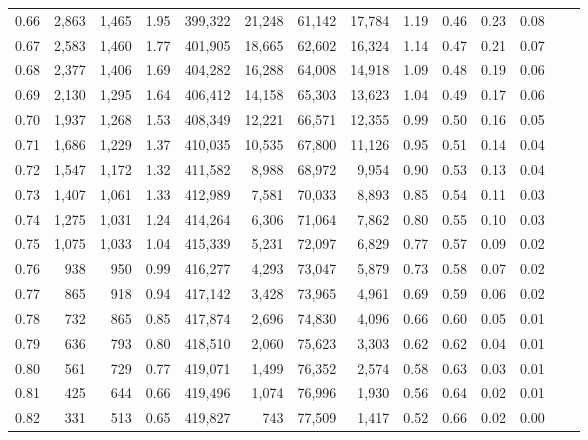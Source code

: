 \begin{tabular}{rrrrrrrrrrrrrr}
0.66 &   2,863 &  1,465 &    1.95 &  399,322 &   21,248 &  61,142 &  17,784 &  1.19 &  0.46 &  0.23 &      0.08 \\
0.67 &   2,583 &  1,460 &    1.77 &  401,905 &   18,665 &  62,602 &  16,324 &  1.14 &  0.47 &  0.21 &      0.07 \\
0.68 &   2,377 &  1,406 &    1.69 &  404,282 &   16,288 &  64,008 &  14,918 &  1.09 &  0.48 &  0.19 &      0.06 \\
0.69 &   2,130 &  1,295 &    1.64 &  406,412 &   14,158 &  65,303 &  13,623 &  1.04 &  0.49 &  0.17 &      0.06 \\
0.70 &   1,937 &  1,268 &    1.53 &  408,349 &   12,221 &  66,571 &  12,355 &  0.99 &  0.50 &  0.16 &      0.05 \\
0.71 &   1,686 &  1,229 &    1.37 &  410,035 &   10,535 &  67,800 &  11,126 &  0.95 &  0.51 &  0.14 &      0.04 \\
0.72 &   1,547 &  1,172 &    1.32 &  411,582 &    8,988 &  68,972 &   9,954 &  0.90 &  0.53 &  0.13 &      0.04 \\
0.73 &   1,407 &  1,061 &    1.33 &  412,989 &    7,581 &  70,033 &   8,893 &  0.85 &  0.54 &  0.11 &      0.03 \\
0.74 &   1,275 &  1,031 &    1.24 &  414,264 &    6,306 &  71,064 &   7,862 &  0.80 &  0.55 &  0.10 &      0.03 \\
0.75 &   1,075 &  1,033 &    1.04 &  415,339 &    5,231 &  72,097 &   6,829 &  0.77 &  0.57 &  0.09 &      0.02 \\
0.76 &     938 &    950 &    0.99 &  416,277 &    4,293 &  73,047 &   5,879 &  0.73 &  0.58 &  0.07 &      0.02 \\
0.77 &     865 &    918 &    0.94 &  417,142 &    3,428 &  73,965 &   4,961 &  0.69 &  0.59 &  0.06 &      0.02 \\
0.78 &     732 &    865 &    0.85 &  417,874 &    2,696 &  74,830 &   4,096 &  0.66 &  0.60 &  0.05 &      0.01 \\
0.79 &     636 &    793 &    0.80 &  418,510 &    2,060 &  75,623 &   3,303 &  0.62 &  0.62 &  0.04 &      0.01 \\
0.80 &     561 &    729 &    0.77 &  419,071 &    1,499 &  76,352 &   2,574 &  0.58 &  0.63 &  0.03 &      0.01 \\
0.81 &     425 &    644 &    0.66 &  419,496 &    1,074 &  76,996 &   1,930 &  0.56 &  0.64 &  0.02 &      0.01 \\
0.82 &     331 &    513 &    0.65 &  419,827 &      743 &  77,509 &   1,417 &  0.52 &  0.66 &  0.02 &      0.00 \\

\end{tabular}

